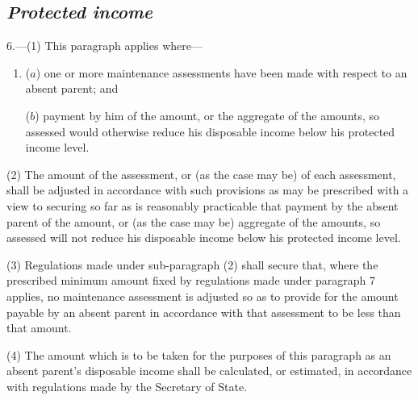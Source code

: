 \documentclass[12pt,a4paper]{article}
\begin{document}

\subsection*{\itshape Protected income}

6.---(1) This paragraph applies where—
\begin{enumerate}\item[]
($a$) one or more maintenance assessments have been made with respect to an absent parent; and

($b$) payment by him of the amount, or the aggregate of the amounts, so assessed would otherwise reduce his disposable income below his protected income level.
\end{enumerate}

(2) The amount of the assessment, or (as the case may be) of each assessment, shall be adjusted in accordance with such provisions as may be prescribed with a view to securing so far as is reasonably practicable that payment by the absent parent of the amount, or (as the case may be) aggregate of the amounts, so assessed will not reduce his disposable income below his protected income level.

(3) Regulations made under sub-paragraph (2)  shall secure that, where the prescribed minimum amount fixed by regulations made under paragraph 7 applies, no maintenance assessment is adjusted so as to provide for the amount payable by an absent parent in accordance with that assessment to be less than that amount.

(4) The amount which is to be taken for the purposes of this paragraph as an absent parent’s disposable income shall be calculated, or estimated, in accordance with regulations made by the Secretary of State.
\end{document}
